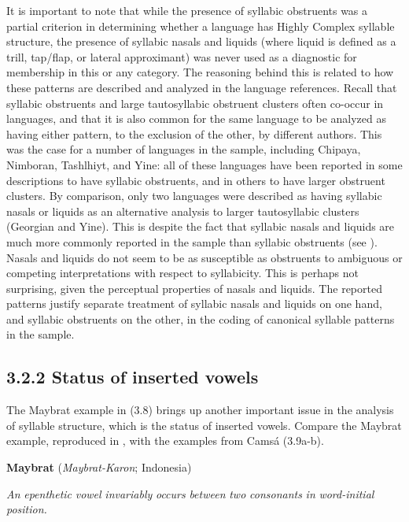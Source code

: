   It is important to note that while the presence of syllabic obstruents was a partial criterion in determining whether a language has Highly Complex syllable structure, the presence of syllabic nasals and liquids (where liquid is defined as a trill, tap/flap, or lateral approximant) was never used as a diagnostic for membership in this or any category. The reasoning behind this is related to how these patterns are described and analyzed in the language references. Recall that syllabic obstruents and large tautosyllabic obstruent clusters often co-occur in languages, and that it is also common for the same language to be analyzed as having either pattern, to the exclusion of the other, by different authors. This was the case for a number of languages in the sample, including Chipaya, Nimboran, Tashlhiyt, and Yine: all of these languages have been reported in some descriptions to have syllabic obstruents, and in others to have larger obstruent clusters. By comparison, only two languages were described as having syllabic nasals or liquids as an alternative analysis to larger tautosyllabic clusters (Georgian and Yine). This is despite the fact that syllabic nasals and liquids are much more commonly reported in the sample than syllabic obstruents (see ). Nasals and liquids do not seem to be as susceptible as obstruents to ambiguous or competing interpretations with respect to syllabicity. This is perhaps not surprising, given the perceptual properties of nasals and liquids. The reported patterns justify separate treatment of syllabic nasals and liquids on one hand, and syllabic obstruents on the other, in the coding of canonical syllable patterns in the sample.

\subsection{3.2.2 Status of inserted vowels}

  The Maybrat example in (3.8) brings up another important issue in the analysis of syllable structure, which is the status of inserted vowels. Compare the Maybrat example, reproduced in , with the examples from Camsá (3.9a-b).

\ea\label{ex:(3.8)}
   \textbf{Maybrat} (\textit{Maybrat-Karon}; Indonesia)

\textit{An} \textit{epenthetic} \textit{vowel} \textit{invariably} \textit{occurs} \textit{between} \textit{two} \textit{consonants} \textit{in} \textit{word-initial} \textit{position.}

